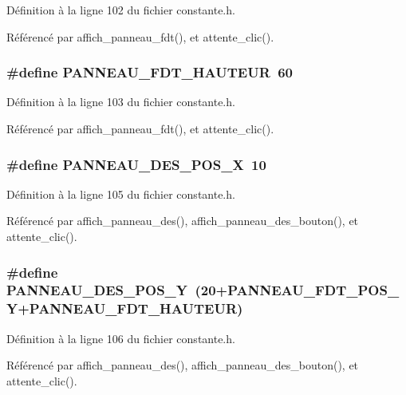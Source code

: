 D\'{e}finition \`{a} la ligne 102 du fichier constante.h.

R\'{e}f\'{e}renc\'{e} par affich\_\-panneau\_\-fdt(), et attente\_\-clic().
\subsubsection{\setlength{\rightskip}{0pt plus 5cm}\#define PANNEAU\_\-FDT\_\-HAUTEUR~60}\label{constante_8h_4a175714e900f7ad5c373a2c5c311510}




D\'{e}finition \`{a} la ligne 103 du fichier constante.h.

R\'{e}f\'{e}renc\'{e} par affich\_\-panneau\_\-fdt(), et attente\_\-clic().
\subsubsection{\setlength{\rightskip}{0pt plus 5cm}\#define PANNEAU\_\-DES\_\-POS\_\-X~10}\label{constante_8h_63baca307b9e9b6f8942b87465cd99a2}




D\'{e}finition \`{a} la ligne 105 du fichier constante.h.

R\'{e}f\'{e}renc\'{e} par affich\_\-panneau\_\-des(), affich\_\-panneau\_\-des\_\-bouton(), et attente\_\-clic().
\subsubsection{\setlength{\rightskip}{0pt plus 5cm}\#define PANNEAU\_\-DES\_\-POS\_\-Y~(20+PANNEAU\_\-FDT\_\-POS\_\-Y+PANNEAU\_\-FDT\_\-HAUTEUR)}\label{constante_8h_d7aca2112d71d91faa220f864e9143ff}




D\'{e}finition \`{a} la ligne 106 du fichier constante.h.

R\'{e}f\'{e}renc\'{e} par affich\_\-panneau\_\-des(), affich\_\-panneau\_\-des\_\-bouton(), et attente\_\-clic().
